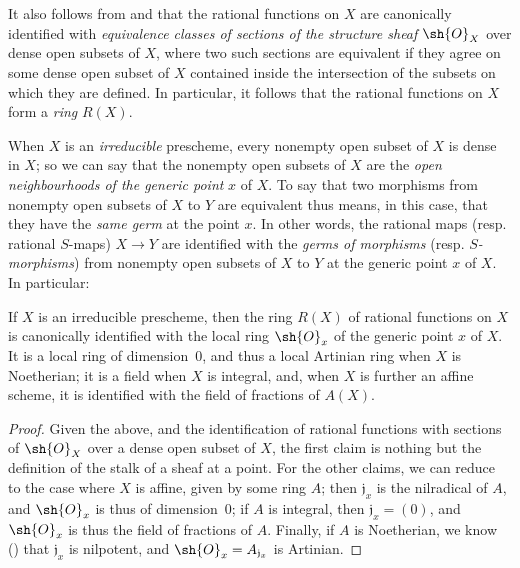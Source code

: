 \begin{env}[7.1.3]
\label{I.7.1.3}
It also follows from  and  that the rational functions on $X$ are canonically identified with \emph{equivalence classes of sections of the structure sheaf $\sh{O}_X$} over dense open subsets of $X$, where two such sections are equivalent if they agree on some dense open subset of $X$ contained inside the intersection of the subsets on which they are defined.
In particular, it follows that the rational functions on $X$ form a \emph{ring} $R(X)$.
\end{env}

\begin{env}[7.1.4]
\label{I.7.1.4}
When $X$ is an \emph{irreducible} prescheme, every nonempty open subset of $X$ is dense in $X$; so we can say that the nonempty open subsets of $X$ are the \emph{open neighbourhoods of the generic point} $x$ of $X$.
To say that two morphisms from nonempty open subsets of $X$ to $Y$ are equivalent thus means, in this case, that they have the \emph{same germ} at the point $x$.
In other words, the rational maps (resp. rational $S$-maps) $X\to Y$ are identified with the \emph{germs of morphisms} (resp. \emph{$S$-morphisms}) from nonempty open subsets of $X$ to $Y$ at the generic point $x$ of $X$.
In particular:
\end{env}

\begin{proposition}[7.1.5]
\label{I.7.1.5}
If $X$ is an irreducible prescheme, then the ring $R(X)$ of rational functions on $X$ is canonically identified with the local ring $\sh{O}_x$ of the generic point $x$ of $X$.
It is a local ring of dimension~0, and thus a local Artinian ring when $X$ is Noetherian; it is a field when $X$ is integral, and, when $X$ is further an affine scheme, it is identified with the field of fractions of $A(X)$.
\end{proposition}

\begin{proof}
Given the above, and the identification of rational functions with sections of $\sh{O}_X$ over a dense open subset of $X$, the first claim is nothing but the definition of the stalk of a sheaf at a point.
For the other claims, we can reduce to the case where $X$ is affine, given by some ring $A$; then $\mathfrak{j}_x$ is the nilradical of $A$, and $\sh{O}_x$ is thus of dimension~0; if $A$ is integral, then $\mathfrak{j}_x=(0)$, and $\sh{O}_x$ is thus the field of fractions of $A$.
Finally, if $A$ is Noetherian, we know (\cite[p.~127, cor.~4]{I-11}) that $\mathfrak{j}_x$ is nilpotent, and $\sh{O}_x=A_{\mathfrak{j}_x}$ is Artinian.
\end{proof}


